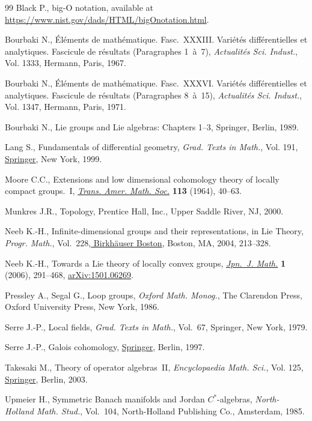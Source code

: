 \documentclass[11pt]{article}
\numberwithin{equation}{section}
\numberwithin{equation}{section}
\begin{document}
\begin{thebibliography}{99}
Black P., big-{O} notation, available at
 \url{https://www.nist.gov/dads/HTML/bigOnotation.html}.

Bourbaki N., \'El\'ements de math\'ematique. {F}asc.~{XXXIII}. {V}ari\'et\'es
 diff\'erentielles et analytiques. {F}ascicule de r\'esultats ({P}aragraphes
 1~\`a~7), \textit{Actualit\'es Sci. Indust.}, Vol. 1333, Hermann, Paris,
 1967.

Bourbaki N., \'El\'ements de math\'ematique. {F}asc.~{XXXVI}. {V}ari\'et\'es
 diff\'erentielles et analytiques. {F}ascicule de r\'esultats ({P}aragraphes
 8~\`a~15), \textit{Actualit\'es Sci. Indust.}, Vol. 1347, Hermann, Paris,
 1971.

Bourbaki N., Lie groups and {L}ie algebras: {C}hapters 1--3, Springer, Berlin,
 1989.

Lang S., Fundamentals of differential geometry, \textit{Grad. Texts in Math.},
 Vol. 191, \href{https://doi.org/10.1007/978-1-4612-0541-8}{Springer}, New York, 1999.

Moore C.C., Extensions and low dimensional cohomology theory of locally compact
 groups.~{I}, \href{https://doi.org/10.2307/1994090}{\textit{Trans. Amer. Math. Soc.}} \textbf{113} (1964), 40--63.

Munkres J.R., Topology, Prentice Hall, Inc., Upper Saddle River, NJ, 2000.

Neeb K.-H., Infinite-dimensional groups and their representations, in Lie
 {T}heory, \textit{Progr. Math.}, Vol.~228,\href{https://doi.org/10.1007/978-0-8176-8192-0_2}{ Birkh\"auser Boston}, Boston, MA,
 2004, 213--328.

Neeb K.-H., Towards a {L}ie theory of locally convex groups, \href{https://doi.org/10.1007/s11537-006-0606-y}{\textit{Jpn.~J.
 Math.}} \textbf{1} (2006), 291--468, \href{https://arxiv.org/abs/1501.06269}{arXiv:1501.06269}.

Pressley A., Segal G., Loop groups, \textit{Oxford Math. Monog.}, The Clarendon Press,
 Oxford University Press, New York, 1986.

Serre J.-P., Local fields, \textit{Grad. Texts in Math.}, Vol.~67, Springer, New
 York, 1979.

Serre J.-P., Galois cohomology, \href{https://doi.org/10.1007/978-3-642-59141-9}{Springer}, Berlin, 1997.

Takesaki M., Theory of operator algebras~{II}, \textit{Encyclopaedia Math.
 Sci.}, Vol. 125, \href{https://doi.org/10.1007/978-3-662-10451-4}{Springer}, Berlin, 2003.

Upmeier H., Symmetric {B}anach manifolds and {J}ordan {$C^\ast$}-algebras,
 \textit{North-Holland Math. Stud.}, Vol.~104, North-Holland Publishing Co.,
 Amsterdam, 1985.

\end{thebibliography}
\end{document}

